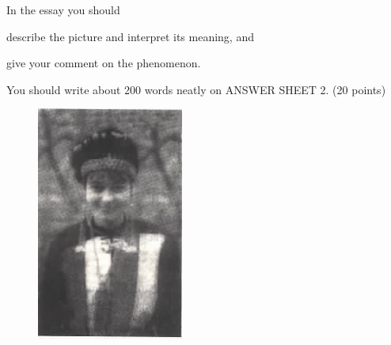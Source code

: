 In the essay you should
\begin{listwrite}
\item 
 describe the picture and interpret its meaning, and



\item
 give your comment on the phenomenon.
\end{listwrite}

You should write about 200 words neatly on ANSWER SHEET 2. (20 points)

\begin{figure}[h!]
	\centering
	\includegraphics[width=0.3\linewidth]{picture/2002.png}
\end{figure}


\checkpagenumber



